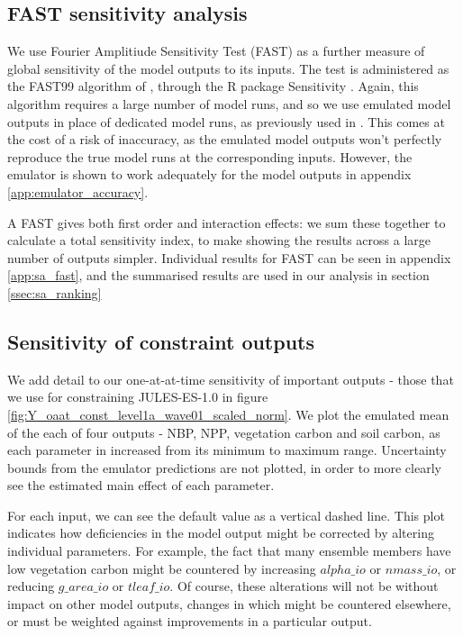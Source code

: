 \documentclass[gmd, manuscript]{copernicus}
\begin{document}
\subsection{FAST sensitivity analysis}\label{ssec:sa_fast}

We use Fourier Amplitiude Sensitivity Test (FAST) as a further measure of global sensitivity of the model outputs to its inputs. The test is administered as the FAST99 algorithm of \cite{saltelli1999sensitivity}, through the R package Sensitivity \citep{Rpackage2015sensitivity}. Again, this algorithm requires a large number of model runs, and so we use emulated model outputs in place of dedicated model runs, as previously used in \cite{mcneall2020correcting, mcneall2016impact, carslaw2013large}. This comes at the cost of a risk of inaccuracy, as the emulated model outputs won't perfectly reproduce the true model runs at the corresponding inputs. However, the emulator is shown to work adequately for the model outputs in appendix \ref{app:emulator_accuracy}. 

A FAST gives both first order and interaction effects: we sum these together to calculate a total sensitivity index, to make showing the results across a large number of outputs simpler. Individual results for FAST can be seen in appendix \ref{app:sa_fast}, and the summarised results are used in our analysis in section \ref{ssec:sa_ranking}

\subsection{Sensitivity of constraint outputs}\label{ssec:sa_constraint_outputs}

We add detail to our one-at-at-time sensitivity of important outputs - those that we use for constraining JULES-ES-1.0 in figure \ref{fig:Y_oaat_const_level1a_wave01_scaled_norm}. We plot the emulated mean of the each of four outputs - NBP, NPP, vegetation carbon and soil carbon, as each parameter in increased from its minimum to maximum range. Uncertainty bounds from the emulator predictions are not plotted, in order to more clearly see the estimated main effect of each parameter.

For each input, we can see the default value as a vertical dashed line. This plot indicates how deficiencies in the model output might be corrected by altering individual parameters. For example, the fact that many ensemble members have low vegetation carbon might be countered by increasing $alpha\_io$ or $nmass\_io$, or reducing $g\_area\_io$ or $tleaf\_io$. Of course, these alterations will not be without impact on other model outputs, changes in which might be countered elsewhere, or must be weighted against improvements in a particular output.
\end{document}
